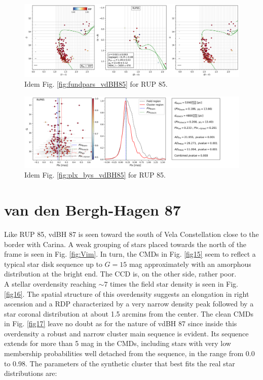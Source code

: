\documentclass[referee]{aa}
\begin{document}
\begin{figure}[ht]
    \centering
    \includegraphics[width=\hsize]{../figs/cmds_rup85.png}
    \caption{Idem Fig. \ref{fig:fundpars_vdBH85} for RUP 85.}
    \label{fig9}
\end{figure}

\begin{figure}[ht]
    \centering
    \includegraphics[width=\hsize]{../figs/plx_RUP85.png}
    \caption{Idem Fig. \ref{fig:plx_bys_vdBH85} for RUP 85.}
    \label{fig10}
\end{figure}





\section{van den Bergh-Hagen 87}

Like RUP 85, vdBH 87 is seen toward the south of Vela Constellation close to
the border with Carina. A weak grouping of stars placed towards the north of
the frame is seen in Fig. \ref{fig:Vim}. In turn, the CMDs in Fig. \ref{fig15}
seem to reflect a typical star disk sequence up to $G=15$ mag approximately
with an amorphous distribution at the bright end. The CCD is, on the other
side, rather poor.\\

A stellar overdensity reaching $\sim7$ times the field star density is
seen in Fig. \ref{fig16}. The spatial structure of this overdensity suggests an
elongation in right ascension and a RDP characterized by a very narrow density
peak followed by a star coronal distribution at about 1.5 arcmins from the
center.
The clean CMDs in Fig. \ref{fig17} leave no doubt as for the nature of vdBH 87
since inside this overdensity a robust and narrow cluster main
sequence is evident. Its sequence extends for more than 5 mag in the
CMDs, including stars with very low membership probabilities well detached
from the sequence, in the range from 0.0 to 0.98. The parameters of the
synthetic cluster that best fits the real star distributions are:
\end{document}
